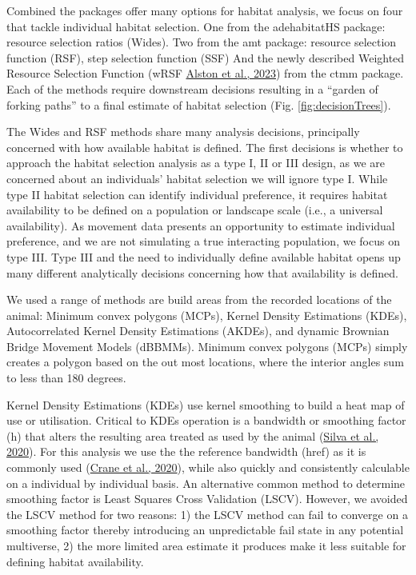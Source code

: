 \documentclass[10pt,a4paper]{article}
\begin{document}
Combined the packages offer many options for habitat analysis, we focus on four that tackle individual habitat selection.
One from the adehabitatHS package: resource selection ratios (Wides).
Two from the amt package: resource selection function (RSF), step selection function (SSF)
And the newly described Weighted Resource Selection Function (wRSF \protect\hyperlink{ref-alston_mitigating_2023}{Alston et al., 2023}) from the ctmm package.
Each of the methods require downstream decisions resulting in a ``garden of forking paths'' to a final estimate of habitat selection (Fig. \ref{fig:decisionTrees}).

The Wides and RSF methods share many analysis decisions, principally concerned with how available habitat is defined.
The first decisions is whether to approach the habitat selection analysis as a type I, II or III design, as we are concerned about an individuals' habitat selection we will ignore type I.
While type II habitat selection can identify individual preference, it requires habitat availability to be defined on a population or landscape scale (i.e., a universal availability).
As movement data presents an opportunity to estimate individual preference, and we are not simulating a true interacting population, we focus on type III.
Type III and the need to individually define available habitat opens up many different analytically decisions concerning how that availability is defined.

We used a range of methods are build areas from the recorded locations of the animal: Minimum convex polygons (MCPs), Kernel Density Estimations (KDEs), Autocorrelated Kernel Density Estimations (AKDEs), and dynamic Brownian Bridge Movement Models (dBBMMs).
Minimum convex polygons (MCPs) simply creates a polygon based on the out most locations, where the interior angles sum to less than 180 degrees.

Kernel Density Estimations (KDEs) use kernel smoothing to build a heat map of use or utilisation.
Critical to KDEs operation is a bandwidth or smoothing factor (h) that alters the resulting area treated as used by the animal (\protect\hyperlink{ref-silva_reptiles_2020}{Silva et al., 2020}).
For this analysis we use the the reference bandwidth (href) as it is commonly used (\protect\hyperlink{ref-crane_lots_2020}{Crane et al., 2020}), while also quickly and consistently calculable on a individual by individual basis.
An alternative common method to determine smoothing factor is Least Squares Cross Validation (LSCV).
However, we avoided the LSCV method for two reasons: 1) the LSCV method can fail to converge on a smoothing factor thereby introducing an unpredictable fail state in any potential multiverse, 2) the more limited area estimate it produces make it less suitable for defining habitat availability.
\end{document}
